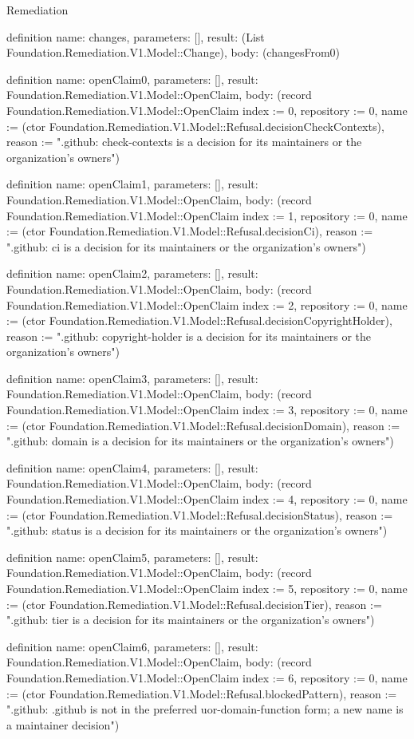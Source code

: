 \begin{lexlean}{Remediation}
\begin{semanticmodule}
definition{
  name: changes,
  parameters: [],
  result: (List Foundation.Remediation.V1.Model::Change),
  body: (changesFrom0)
}

definition{
  name: openClaim0,
  parameters: [],
  result: Foundation.Remediation.V1.Model::OpenClaim,
  body: (record Foundation.Remediation.V1.Model::OpenClaim {index := 0, repository := 0, name := (ctor Foundation.Remediation.V1.Model::Refusal.decisionCheckContexts), reason := ".github: check-contexts is a decision for its maintainers or the organization's owners"})
}

definition{
  name: openClaim1,
  parameters: [],
  result: Foundation.Remediation.V1.Model::OpenClaim,
  body: (record Foundation.Remediation.V1.Model::OpenClaim {index := 1, repository := 0, name := (ctor Foundation.Remediation.V1.Model::Refusal.decisionCi), reason := ".github: ci is a decision for its maintainers or the organization's owners"})
}

definition{
  name: openClaim2,
  parameters: [],
  result: Foundation.Remediation.V1.Model::OpenClaim,
  body: (record Foundation.Remediation.V1.Model::OpenClaim {index := 2, repository := 0, name := (ctor Foundation.Remediation.V1.Model::Refusal.decisionCopyrightHolder), reason := ".github: copyright-holder is a decision for its maintainers or the organization's owners"})
}

definition{
  name: openClaim3,
  parameters: [],
  result: Foundation.Remediation.V1.Model::OpenClaim,
  body: (record Foundation.Remediation.V1.Model::OpenClaim {index := 3, repository := 0, name := (ctor Foundation.Remediation.V1.Model::Refusal.decisionDomain), reason := ".github: domain is a decision for its maintainers or the organization's owners"})
}

definition{
  name: openClaim4,
  parameters: [],
  result: Foundation.Remediation.V1.Model::OpenClaim,
  body: (record Foundation.Remediation.V1.Model::OpenClaim {index := 4, repository := 0, name := (ctor Foundation.Remediation.V1.Model::Refusal.decisionStatus), reason := ".github: status is a decision for its maintainers or the organization's owners"})
}

definition{
  name: openClaim5,
  parameters: [],
  result: Foundation.Remediation.V1.Model::OpenClaim,
  body: (record Foundation.Remediation.V1.Model::OpenClaim {index := 5, repository := 0, name := (ctor Foundation.Remediation.V1.Model::Refusal.decisionTier), reason := ".github: tier is a decision for its maintainers or the organization's owners"})
}

definition{
  name: openClaim6,
  parameters: [],
  result: Foundation.Remediation.V1.Model::OpenClaim,
  body: (record Foundation.Remediation.V1.Model::OpenClaim {index := 6, repository := 0, name := (ctor Foundation.Remediation.V1.Model::Refusal.blockedPattern), reason := ".github: .github is not in the preferred uor-{domain}-{function} form; a new name is a maintainer decision"})
}


\end{semanticmodule}
\end{lexlean}

